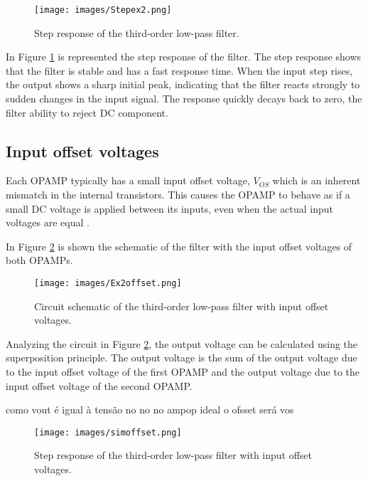 \begin{figure}[H]
    \centering
    \texttt{[image: images/Stepex2.png]}
    \caption{Step response of the third-order low-pass filter.}
    \label{fig:ex2_step}
\end{figure}

In Figure \ref{fig:ex2_step} is represented the step response of the filter. The step response shows that the filter is stable and has a fast response time. When the input step rises, the output shows a sharp initial peak, indicating that the filter reacts strongly to sudden changes in the input signal. The response quickly decays back to zero, the filter ability to reject DC component.

\subsection{Input offset voltages}

Each OPAMP typically has a small input offset voltage, $V_{OS}$ which is an inherent mismatch in the internal transistors. This causes the OPAMP to behave as if a small DC voltage is applied between its inputs, even when the actual input voltages are equal \textsuperscript{\cite{DC-Parameters-Input-Offset-Voltage}}.

In Figure \ref{fig:sch_vos} is shown the schematic of the filter with the input offset voltages of both OPAMPs.

\begin{figure}[H]
    \centering
    \texttt{[image: images/Ex2offset.png]}
    \caption{Circuit schematic of the third-order low-pass filter with input offset voltages.}
    \label{fig:sch_vos}
\end{figure}

Analyzing the circuit in Figure \ref{fig:sch_vos}, the output voltage can be calculated using the superposition principle. The output voltage is the sum of the output voltage due to the input offset voltage of the first OPAMP and the output voltage due to the input offset voltage of the second OPAMP. 

como vout é igual à tensão no no no ampop ideal o ofsset será vos

\begin{figure}[H]
    \centering
    \texttt{[image: images/simoffset.png]}
    \caption{Step response of the third-order low-pass filter with input offset voltages.}
    \label{fig:step_vos}
\end{figure}

